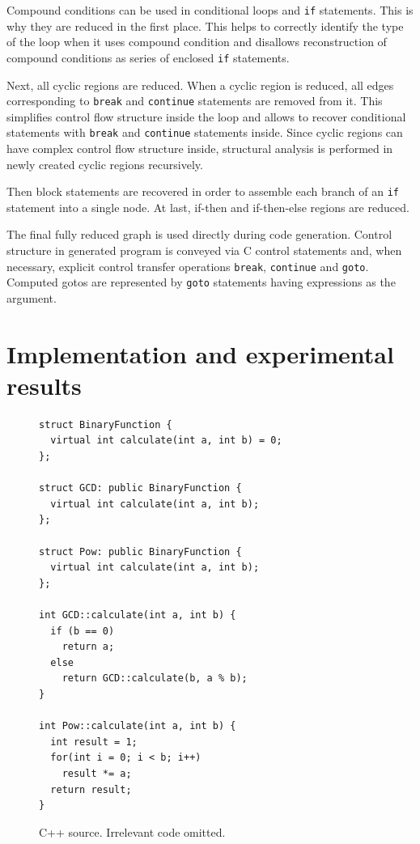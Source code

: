 \documentclass[10pt, conference, compsocconf]{IEEEtran}
\newcommand{\skipsectionspace}{}
\begin{document}
Compound conditions can be used in conditional loops and \lstinline{if} statements.
This is why they are reduced in the first place. 
This helps to correctly identify the type of the loop when it uses compound condition
and disallows reconstruction of compound conditions as series of enclosed \lstinline{if} statements.

Next, all cyclic regions are reduced. 
When a cyclic region is reduced, all edges corresponding to \lstinline{break}
and \lstinline{continue} statements are removed from it. This simplifies control
flow structure inside the loop and allows to recover conditional
statements with \lstinline{break} and \lstinline{continue} statements inside.
Since cyclic regions can have complex control flow structure inside,
structural analysis is performed in newly created cyclic regions recursively.

Then block statements are recovered in order to assemble each branch of
an \lstinline{if} statement into a single node.
At last, if-then and if-then-else regions are reduced.

The final fully reduced graph is used directly during code generation.
Control structure in generated program is conveyed via C control statements
and, when necessary, explicit control transfer operations \lstinline{break},
\lstinline{continue} and \lstinline{goto}. Computed gotos are represented
by \lstinline{goto} statements having expressions as the argument.

%



\section{Implementation and experimental results}\label{sectionExperiments}\skipsectionspace


\begin{figure}[tb!]
\centering
{
\lstset{basicstyle=\scriptsize}
\begin{lstlisting}
struct BinaryFunction {
  virtual int calculate(int a, int b) = 0;
};

struct GCD: public BinaryFunction {
  virtual int calculate(int a, int b);
};

struct Pow: public BinaryFunction {
  virtual int calculate(int a, int b);
};

int GCD::calculate(int a, int b) { 
  if (b == 0)
    return a;
  else
    return GCD::calculate(b, a % b);
}

int Pow::calculate(int a, int b) { 
  int result = 1;
  for(int i = 0; i < b; i++)
    result *= a;
  return result;
}
\end{lstlisting}
}
\caption{C++ source. Irrelevant code omitted.}
\label{fig:src_code}
\end{figure}
\end{document}
